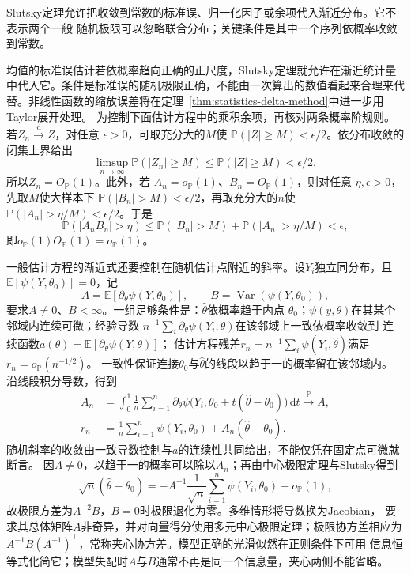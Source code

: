 Slutsky定理允许把收敛到常数的标准误、归一化因子或余项代入渐近分布。它不表示两个一般
随机极限可以忽略联合分布；关键条件是其中一个序列依概率收敛到常数。

均值的标准误估计若依概率趋向正确的正尺度，Slutsky定理就允许在渐近统计量中代入它。条件是标准误的随机极限正确，不能由一次算出的数值看起来合理来代替。非线性函数的缩放误差将在定理~\ref{thm:statistics-delta-method}中进一步用Taylor展开处理。
为控制下面估计方程中的乘积余项，再核对两条概率阶规则。若\(Z_n\xrightarrow{\mathrm d}Z\)，对任意
\(\epsilon>0\)，可取充分大的\(M\)使
\(\mathbb{P}(|Z|\geq M)<\epsilon/2\)。依分布收敛的闭集上界给出
\[
  \limsup_{n\to\infty}\mathbb{P}(|Z_n|\geq M)
  \leq \mathbb{P}(|Z|\geq M)<\epsilon/2,
\]
所以\(Z_n=O_{\mathbb{P}}(1)\)。此外，若
\(A_n=o_{\mathbb{P}}(1)\)、\(B_n=O_{\mathbb{P}}(1)\)，则对任意
\(\eta,\epsilon>0\)，先取\(M\)使大样本下
\(\mathbb{P}(|B_n|>M)<\epsilon/2\)，再取充分大的\(n\)使
\(\mathbb{P}(|A_n|>\eta/M)<\epsilon/2\)。于是
\[
  \mathbb{P}(|A_nB_n|>\eta)
  \leq
  \mathbb{P}(|B_n|>M)
  +\mathbb{P}(|A_n|>\eta/M)
  <\epsilon,
\]
即\(o_{\mathbb{P}}(1)O_{\mathbb{P}}(1)=o_{\mathbb{P}}(1)\)。

一般估计方程的渐近式还要控制在随机估计点附近的斜率。设\(Y_i\)独立同分布，且
\(\mathbb{E}[\psi(Y,\theta_0)]=0\)，记
\[
  A=\mathbb{E}[\partial_\theta\psi(Y,\theta_0)],
  \qquad B=\operatorname{Var}(\psi(Y,\theta_0)),
\]
要求\(A\neq0\)、\(B<\infty\)。一组足够条件是：\(\widehat\theta\)依概率趋于内点
\(\theta_0\)；\(\psi(y,\theta)\)在其某个邻域内连续可微；经验导数
\(n^{-1}\sum_i\partial_\theta\psi(Y_i,\theta)\)在该邻域上一致依概率收敛到
连续函数\(a(\theta)=\mathbb E[\partial_\theta\psi(Y,\theta)]\)；
估计方程残差\(r_n=n^{-1}\sum_i\psi(Y_i,\widehat\theta)\)满足
\(r_n=o_{\mathbb P}(n^{-1/2})\)。
一致性保证连接\(\theta_0\)与\(\widehat\theta\)的线段以趋于一的概率留在该邻域内。
沿线段积分导数，得到
\[
\begin{aligned}
 A_n&=\int_0^1\frac1n\sum_{i=1}^n
  \partial_\theta\psi\bigl(Y_i,\theta_0+t(\widehat\theta-\theta_0)\bigr)\,\mathrm dt
  \xrightarrow{\mathbb P}A,\\
 r_n&=\frac1n\sum_{i=1}^n\psi(Y_i,\theta_0)+A_n(\widehat\theta-\theta_0).
\end{aligned}
\]
随机斜率的收敛由一致导数控制与\(a\)的连续性共同给出，不能仅凭在固定点可微就断言。
因\(A\neq0\)，以趋于一的概率可以除以\(A_n\)；再由中心极限定理与Slutsky得到
\[
  \sqrt n(\widehat\theta-\theta_0)
  =
  -A^{-1}\frac1{\sqrt n}\sum_{i=1}^n\psi(Y_i,\theta_0)
  +o_{\mathbb{P}}(1),
\]
故极限方差为\(A^{-2}B\)，\(B=0\)时极限退化为零。多维情形将导数换为Jacobian，
要求其总体矩阵\(A\)非奇异，并对向量得分使用多元中心极限定理；极限协方差相应为
\(A^{-1}B(A^{-1})^\top\)，常称夹心协方差。模型正确的光滑似然在正则条件下可用
信息恒等式化简它；模型失配时\(A\)与\(B\)通常不再是同一个信息量，夹心两侧不能省略。

